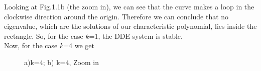 Looking at Fig.1.1b (the zoom in), we can see that the curve makes a loop in the clockwise direction around the origin. Therefore we can conclude that no eigenvalue, which are the solutions of our characteristic polynomial, lies inside the rectangle. So, for the case $k$=1, the DDE system is stable.\\

Now, for the case $k$=4 we get

\begin{figure}[H]
	\caption{a)k=4; b) k=4, Zoom in}
\end{figure}

